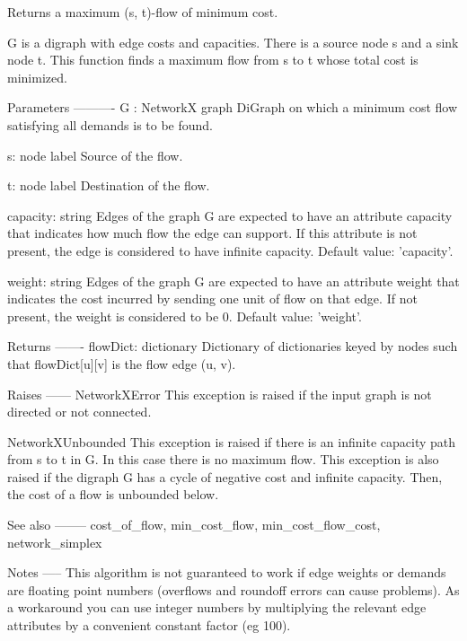 \begin{DoxyVerb}Returns a maximum (s, t)-flow of minimum cost.

G is a digraph with edge costs and capacities. There is a source
node s and a sink node t. This function finds a maximum flow from
s to t whose total cost is minimized.

Parameters
----------
G : NetworkX graph
    DiGraph on which a minimum cost flow satisfying all demands is
    to be found.

s: node label
    Source of the flow.

t: node label
    Destination of the flow.

capacity: string
    Edges of the graph G are expected to have an attribute capacity
    that indicates how much flow the edge can support. If this
    attribute is not present, the edge is considered to have
    infinite capacity. Default value: 'capacity'.

weight: string
    Edges of the graph G are expected to have an attribute weight
    that indicates the cost incurred by sending one unit of flow on
    that edge. If not present, the weight is considered to be 0.
    Default value: 'weight'.

Returns
-------
flowDict: dictionary
    Dictionary of dictionaries keyed by nodes such that
    flowDict[u][v] is the flow edge (u, v).

Raises
------
NetworkXError
    This exception is raised if the input graph is not directed or
    not connected.

NetworkXUnbounded
    This exception is raised if there is an infinite capacity path
    from s to t in G. In this case there is no maximum flow. This
    exception is also raised if the digraph G has a cycle of
    negative cost and infinite capacity. Then, the cost of a flow
    is unbounded below.

See also
--------
cost_of_flow, min_cost_flow, min_cost_flow_cost, network_simplex

Notes
-----
This algorithm is not guaranteed to work if edge weights or demands
are floating point numbers (overflows and roundoff errors can
cause problems). As a workaround you can use integer numbers by
multiplying the relevant edge attributes by a convenient
constant factor (eg 100).


\end{DoxyVerb}
